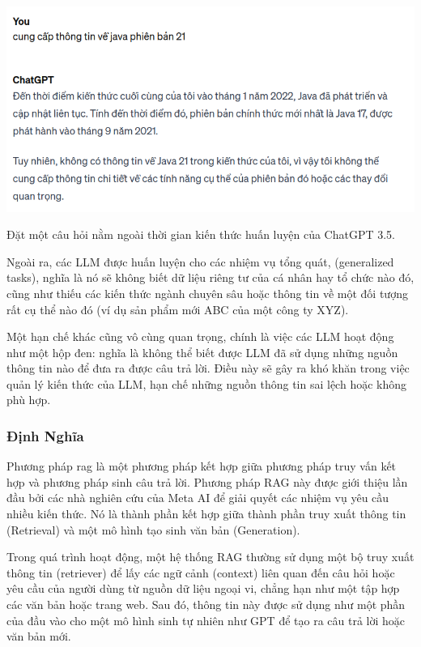 \documentclass[a4paper, 12pt, openany]{book}
\begin{document}
\begin{minipage}{\linewidth}
    \centering
    \includegraphics[width=14cm]{./assets/images/llm-limitation-1.png}
    \captionsetup{type=figure}
    \caption{Đặt một câu hỏi nằm ngoài thời gian kiến thức huấn luyện của ChatGPT 3.5.}
\end{minipage}

\vspace{0.2cm}

Ngoài ra, các LLM được huấn luyện cho các nhiệm vụ tổng quát, (generalized tasks), nghĩa là nó sẽ không biết dữ liệu riêng tư của cá nhân hay tổ chức nào đó, 
cũng như thiếu các kiến thức ngành chuyên sâu hoặc thông tin về một đối tượng rất cụ thể nào đó (ví dụ sản phẩm mới ABC của một công ty XYZ). 

Một hạn chế khác cũng vô cùng quan trọng, chính là việc các LLM hoạt động như một hộp đen: 
nghĩa là không thể biết được LLM đã sử dụng những nguồn thông tin nào để đưa ra được câu trả lời. Điều này sẽ gây ra
khó khăn trong việc quản lý kiến thức của LLM, hạn chế những nguồn thông tin sai lệch hoặc không phù hợp.


\subsubsection{Định Nghĩa}
Phương pháp \ac{rag} là một phương pháp kết hợp giữa phương pháp truy vấn kết hợp và phương pháp sinh câu trả lời.
Phương pháp RAG \cite{lewis2021retrievalaugmented} này được giới thiệu lần đầu bởi các nhà nghiên cứu của Meta AI để giải quyết các nhiệm vụ yêu cầu nhiều kiến thức.
Nó là thành phần kết hợp giữa thành phần truy xuất thông tin (Retrieval) và một mô hình tạo sinh văn bản (Generation).

Trong quá trình hoạt động, một hệ thống RAG thường sử dụng một bộ truy xuất thông tin (retriever) để lấy các ngữ cảnh (context) liên quan đến câu hỏi hoặc yêu cầu của người dùng từ nguồn dữ liệu ngoại vi, chẳng hạn như một tập hợp các văn bản hoặc trang web. Sau đó, thông tin này được sử dụng như một phần của đầu vào cho một mô hình sinh tự nhiên như GPT để tạo ra câu trả lời hoặc văn bản mới.
\end{document}
